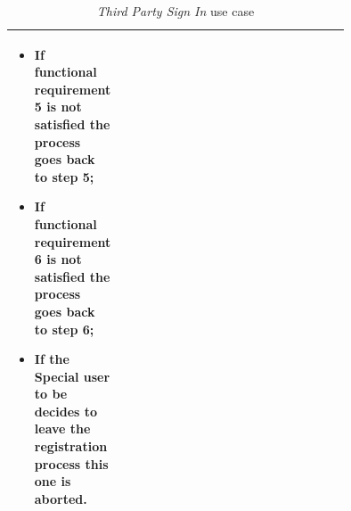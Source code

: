 \begin{center}
\begin{table}[H]
{\begin{tabular}{ | l | p{0.75\linewidth} | }
\begin{minipage}[t]{0.7\textwidth}
\begin{itemize}
      \item If functional requirement 5 is not satisfied the process goes back to step 5;
      \item If functional requirement 6 is not satisfied the process goes back to step 6;
      \item If the \textbf{Special user to be} decides to leave the registration process this one is aborted.
    \end{itemize}
    \smallskip
  \end{minipage}  \\ \hline
\end{tabular}}
\caption{\textit{Third Party Sign In} use case}
\label{table:thirdPartySignInTable}
\end{table}
\end{center}

